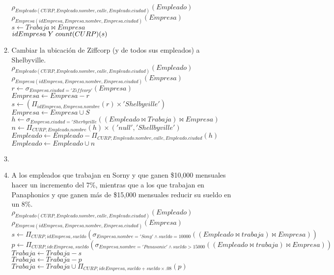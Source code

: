 \documentclass{article}
\begin{document}
\begin{enumerate}
\begin{enumerate}
				$\rho_{Empleado(CURP, Empleado.nombre, calle, Empleado.ciudad)}(Empleado)$\\
				$\rho_{Empresa(idEmpresa, Empresa.nombre, Empresa.ciudad)}(Empresa)$\\
				$s \leftarrow Trabaja \bowtie Empresa$\\
				${idEmpresa} \hspace{1mm} Y \hspace{1mm} {count(CURP)(s)}$\\
				
				\item Cambiar la ubicación de Ziffcorp (y de todos sus empleados) a Shelbyville.\\
				
				$\rho_{Empleado(CURP, Empleado.nombre, calle, Empleado.ciudad)}(Empleado)$\\
				$\rho_{Empresa(idEmpresa, Empresa.nombre, Empresa.ciudad)}(Empresa)$\\
				$r \leftarrow \sigma_{Empresa.ciudad = 'Ziffcorp'}(Empresa)$\\
				$Empresa \leftarrow Empresa - r$\\
				$s \leftarrow (\Pi_{idEmpresa, Empresa.nombre}(r) \times 'Shelbyville')$\\
				$Empresa \leftarrow Empresa \cup S$\\
				$h \leftarrow \sigma_{Empresa.ciudad = 'Sherbyville}((Empleado \bowtie Trabaja) \bowtie Empresa)$\\
				$n \leftarrow \Pi_{CURP, Empleado.nombre}(h) \times ('null', 'Shellbyville')$\\
				$Empleado \leftarrow Empleado - \Pi_{CURP, Empleado.nombre, calle, Empleado.ciudad}(h)$\\
				$Empleado \leftarrow Empleado \cup n$
				
				\item
				\item A los empleados que trabajan en Sorny y que ganen \$10,000 mensuales hacer un incremento
				del 7\%, mientras que a los que trabajan en Panaphonics y que ganen más de \$15,000
				mensuales reducir su sueldo en un 8\%.\\
				
				$\rho_{Empleado(CURP, Empleado.nombre, calle, Empleado.ciudad)}(Empleado)$\\
				$\rho_{Empresa(idEmpresa, Empresa.nombre, Empresa.ciudad)}(Empresa)$\\
				$s \leftarrow \Pi_{CURP,idEmpresa, sueldo}(\sigma_{Empresa.nombre = 'Sony' \land sueldo = 10000}((Empleado \bowtie trabaja) \bowtie Empresa))$\\
				$p \leftarrow \Pi_{CURP, ideEmpresa, sueldo}(\sigma_{Empresa.nombre = 'Panasonic' \land sueldo > 15000}((Empleado \bowtie trabaja) \bowtie Empresa))$\\
				$Trabaja \leftarrow Trabaja - s$\\
				$Trabaja \leftarrow Trabaja - p$\\
				$Trabaja \leftarrow Trabaja\cup \Pi_{CURP, ideEmpresa, sueldo + sueldo \times .08}(p)$\\
				

\end{enumerate}
\end{enumerate}
\end{document}
